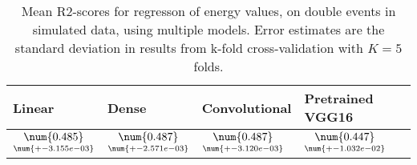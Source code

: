 \begin{table}
\centering
\caption{
Mean R2-scores for regresson of energy values, on double events in simulated data, using multiple models. 
Error estimates are the standard deviation in results from k-fold cross-validation 
with $K=5$ folds.
}
\label{tab:regression-simulated-double-energy-pixelmod-r2}
\begin{tabular}{llll}
\toprule
                                             Linear &                                               Dense &                                       Convolutional &                                    Pretrained VGG16 \\
\midrule
 $\underset{\num{+- 3.155e-03 }  }{\num{ 0.485 } }$ &  $\underset{\num{+- 2.571e-03 }  }{\num{ 0.487 } }$ &  $\underset{\num{+- 3.120e-03 }  }{\num{ 0.487 } }$ &  $\underset{\num{+- 1.032e-02 }  }{\num{ 0.447 } }$ \\
\bottomrule
\end{tabular}
\end{table}

